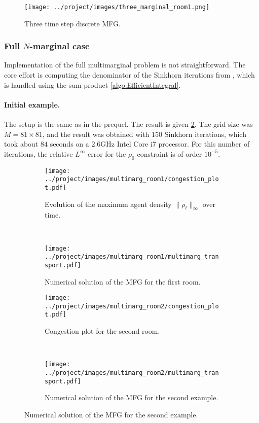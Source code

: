 \documentclass[../report.tex]{subfiles}
\begin{document}
\begin{figure}[h]
	\centering
	\texttt{[image: ../project/images/three\_marginal\_room1.png]}
	\caption{Three time step discrete MFG.}\label{fig:3MargTransport}
\end{figure}





\subsubsection{Full $N$-marginal case}

Implementation of the full multimarginal problem is not straightforward. The core effort is computing the denominator of the Sinkhorn iterations from , which is handled using the sum-product \cref{algo:EfficientIntegral}.


\paragraph{Initial example.} The setup is the same as in the prequel. The result is given \cref{fig:NMargEx1Soltn}. The grid size was $M = 81\times 81$, and the result was obtained with $150$ Sinkhorn iterations, which took about $84$ seconds on a 2.6GHz Intel Core i7 processor. For this number of iterations, the relative $L^\infty$ error for the $\rho_0$ constraint is of order $10^{-5}$.

\begin{figure}[h]
	\centering
	\begin{subfigure}[c]{.45\linewidth}
	\texttt{[image: ../project/images/multimarg\_room1/congestion\_plot.pdf]}
	\caption{Evolution of the maximum agent density $\|\rho_t\|_\infty$ over time.}
	\end{subfigure}~
	\begin{subfigure}[c]{.55\linewidth}
	\texttt{[image: ../project/images/multimarg\_room1/multimarg\_transport.pdf]}
	\caption{Numerical solution of the MFG for the first room.}\label{fig:NMargEx1Soltn}
	\end{subfigure}
	\begin{subfigure}[c]{.45\linewidth}
		\texttt{[image: ../project/images/multimarg\_room2/congestion\_plot.pdf]}\caption{Congestion plot for the second room.}
	\end{subfigure}~
	\begin{subfigure}[c]{.55\linewidth}
		\texttt{[image: ../project/images/multimarg\_room2/multimarg\_transport.pdf]}
		\caption{Numerical solution of the MFG for the second example.}\label{fig:NMarg2Steps}
	\end{subfigure}
\end{figure}
\end{document}
